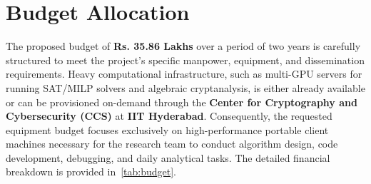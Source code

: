 	
	
	\section{Budget Allocation}
	The proposed budget of \textbf{Rs. 35.86 Lakhs} over a period of two years is carefully structured to meet the project's specific manpower, equipment, and dissemination requirements.
	Heavy computational infrastructure, such as multi-GPU servers for running SAT/MILP solvers and algebraic cryptanalysis, is either already available or can be provisioned on-demand through the \textbf{Center for Cryptography and Cybersecurity (CCS)} at \textbf{IIT Hyderabad}.
	Consequently, the requested equipment budget focuses exclusively on high-performance portable client machines necessary for the research team to conduct algorithm design, code development, debugging, and daily analytical tasks. The detailed financial breakdown is provided in~\cref{tab:budget}.
	

